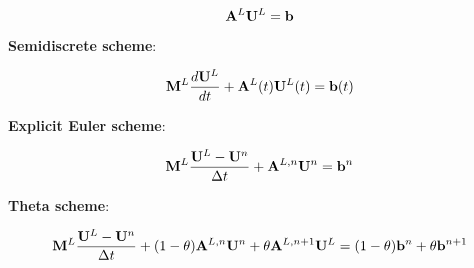\begin{equation}\label{eq:low_ss}
   \loworderssmatrix\lowordersolution = \ssrhs
\end{equation}
\begin{center}{\textbf{Semidiscrete scheme}:}\end{center}
\begin{equation}\label{eq:low_semidiscrete}
   \lumpedmassmatrix\ddt{\lowordersolution}
    + \loworderssmatrix(\timevalue)\lowordersolution(\timevalue) 
    = \ssrhs(\timevalue)
\end{equation}
\begin{center}{\textbf{Explicit Euler scheme}:}\end{center}
\begin{equation}\label{eq:low_explicit_euler}
  \lumpedmassmatrix\frac{\lowordersolution-\solutionvector^{\timeindex}}
  {\timestepsize}
  + \loworderssmatrix[\timeindex]\solutionvector^{\timeindex}
  = \ssrhs^\timeindex
\end{equation}
\begin{center}{\textbf{Theta scheme}:}\end{center}
\begin{equation}\label{eq:low_theta}
  \lumpedmassmatrix\frac{\lowordersolution-\solutionvector^\timeindex}
  {\timestepsize}
  + (1-\theta)\loworderssmatrix[\timeindex]\solutionvector^\timeindex
  + \theta\loworderssmatrix[\timeindex+1]\lowordersolution
  = (1-\theta)\ssrhs^\timeindex + \theta\ssrhs^{\timeindex+1}
\end{equation}

